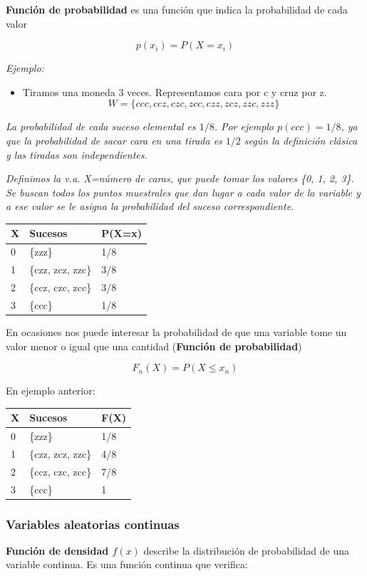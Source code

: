 \documentclass[]{article}
\def\tightlist{}
\numberwithin{equation}{section}
\begin{document}
\textbf{Función de probabilidad} es una función que indica la
probabilidad de cada valor

\[
      p(x_i) = P(X=x_i)
  \]

\emph{Ejemplo:}

\begin{itemize}
\tightlist
\item
  Tiramos una moneda 3 veces. Representamos cara por c y cruz por z. \[
      W = \{ccc, ccz, czc, zcc, czz, zcz, zzc, zzz\}
      \]
\end{itemize}

\emph{La probabilidad de cada suceso elemental es \(1/8\). Por ejemplo
\(p(ccc)=1/8\), ya que la probabilidad de sacar cara en una tirada es
\(1/2\) según la definición clásica y las tiradas son independientes.}

\emph{Definimos la v.a. X=número de caras, que puede tomar los valores
\{0, 1, 2, 3\}. Se buscan todos los puntos muestrales que dan lugar a
cada valor de la variable y a ese valor se le asigna la probabilidad del
suceso correspondiente.}

\begin{longtable}[]{@{}lll@{}}
\toprule
X & Sucesos & P(X=x)\tabularnewline
\midrule
\endhead
0 & \{zzz\} & 1/8\tabularnewline
1 & \{czz, zcz, zzc\} & 3/8\tabularnewline
2 & \{ccz, czc, zcc\} & 3/8\tabularnewline
3 & \{ccc\} & 1/8\tabularnewline
\bottomrule
\end{longtable}

En ocasiones nos puede interesar la probabilidad de que una variable
tome un valor menor o igual que una cantidad (\textbf{Función de
probabilidad})

\[
F_n(X) = P(X\leq x_n) 
\]

En ejemplo anterior:

\begin{longtable}[]{@{}lll@{}}
\toprule
X & Sucesos & F(X)\tabularnewline
\midrule
\endhead
0 & \{zzz\} & 1/8\tabularnewline
1 & \{czz, zcz, zzc\} & 4/8\tabularnewline
2 & \{ccz, czc, zcc\} & 7/8\tabularnewline
3 & \{ccc\} & 1\tabularnewline
\bottomrule
\end{longtable}

\subsubsection{Variables aleatorias
continuas}\label{variables-aleatorias-continuas}

\textbf{Función de densidad \(f(x)\)} describe la distribución de
probabilidad de una variable continua. Es una función continua que
verifica:
\end{document}
